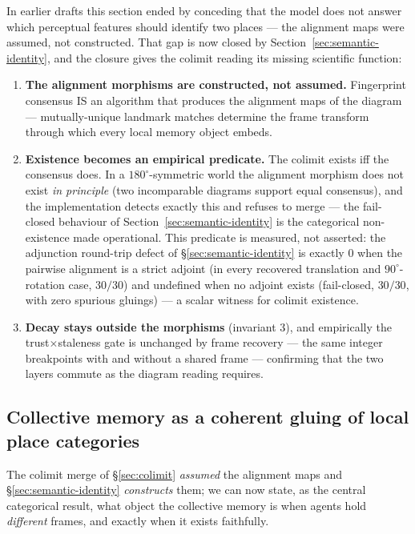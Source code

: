 \documentclass{article}
\begin{document}
In earlier drafts this section ended by conceding that the model does
not answer which perceptual features should identify two places ---
the alignment maps were assumed, not constructed. That gap is now
closed by Section~\ref{sec:semantic-identity}, and the closure gives
the colimit reading its missing scientific function:
\begin{enumerate}[leftmargin=20pt,itemsep=2pt,topsep=2pt]
\item \textbf{The alignment morphisms are constructed, not assumed.}
  Fingerprint consensus IS an algorithm that produces the alignment
  maps of the diagram --- mutually-unique landmark matches determine
  the frame transform through which every local memory object embeds.
\item \textbf{Existence becomes an empirical predicate.} The colimit
  exists iff the consensus does. In a $180^\circ$-symmetric world the
  alignment morphism does not exist \emph{in principle} (two
  incomparable diagrams support equal consensus), and the
  implementation detects exactly this and refuses to merge --- the
  fail-closed behaviour of Section~\ref{sec:semantic-identity} is the
  categorical non-existence made operational. This predicate is
  measured, not asserted: the adjunction round-trip defect of
  \S\ref{sec:semantic-identity} is exactly $0$ when the pairwise
  alignment is a strict adjoint (in every recovered translation and
  $90^\circ$-rotation case, $30/30$) and undefined when no adjoint
  exists (fail-closed, $30/30$, with zero spurious gluings) --- a scalar
  witness for colimit existence.
\item \textbf{Decay stays outside the morphisms} (invariant 3), and
  empirically the trust$\times$staleness gate is unchanged by frame
  recovery --- the same integer breakpoints with and without a shared
  frame --- confirming that the two layers commute as the diagram
  reading requires.
\end{enumerate}

\subsection{Collective memory as a coherent gluing of local place categories}
\label{sec:gluing}

The colimit merge of \S\ref{sec:colimit} \emph{assumed} the alignment maps and
\S\ref{sec:semantic-identity} \emph{constructs} them; we can now state, as the
central categorical result, what object the collective memory is when agents
hold \emph{different} frames, and exactly when it exists faithfully.
\end{document}
